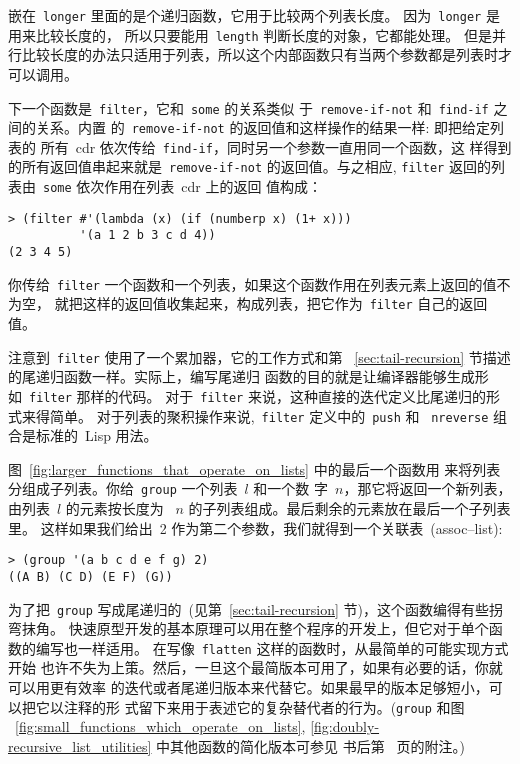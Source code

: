 嵌在~\texttt{longer} 里面的是个递归函数，它用于比较两个列表长度。
因为~\texttt{longer} 是用来比较长度的，
所以只要能用~\texttt{length} 判断长度的对象，它都能处理。
但是并行比较长度的办法只适用于列表，所以这个内部函数只有当两个参数都是列表时才可以调用。

下一个函数是~\texttt{filter}，它和~\texttt{some} 的关系类似
于~\texttt{remove-if-not} 和~\texttt{find-if} 之间的关系。内置
的~\texttt{remove-if-not} 的返回值和这样操作的结果一样: 即把给定列表的
所有~cdr 依次传给~\texttt{find-if}，同时另一个参数一直用同一个函数，这
样得到的所有返回值串起来就是~\texttt{remove-if-not} 的返回值。与之相应,
\texttt{filter} 返回的列表由~\texttt{some} 依次作用在列表~cdr 上的返回
值构成：

\begin{lstlisting}
> (filter #'(lambda (x) (if (numberp x) (1+ x)))
          '(a 1 2 b 3 c d 4))
(2 3 4 5)
\end{lstlisting}

你传给~\texttt{filter} 一个函数和一个列表，如果这个函数作用在列表元素上返回的值不为空，
就把这样的返回值收集起来，构成列表，把它作为~\texttt{filter} 自己的返回值。

注意到~\texttt{filter} 使用了一个累加器，它的工作方式和第
~\ref{sec:tail-recursion} 节描述的尾递归函数一样。实际上，编写尾递归
函数的目的就是让编译器能够生成形如~\texttt{filter} 那样的代码。
对于~\texttt{filter} 来说，这种直接的迭代定义比尾递归的形式来得简单。
对于列表的聚积操作来说,~\texttt{filter} 定义中的~\texttt{push} 和
~\texttt{nreverse} 组合是标准的~Lisp 用法。

图~\ref{fig:larger_functions_that_operate_on_lists} 中的最后一个函数用
来将列表分组成子列表。你给~\texttt{group} 一个列表~$l$ 和一个数
字~$n$，那它将返回一个新列表，由列表~$l$ 的元素按长度为
~$n$ 的子列表组成。最后剩余的元素放在最后一个子列表里。
这样如果我们给出~2 作为第二个参数，我们就得到一个关联表~(assoc--list):
\begin{lstlisting}
> (group '(a b c d e f g) 2)
((A B) (C D) (E F) (G))
\end{lstlisting}

为了把~\texttt{group} 写成尾递归的~(见第~\ref{sec:tail-recursion} 节)，这个函数编得有些拐弯抹角。
快速原型开发的基本原理可以用在整个程序的开发上，但它对于单个函数的编写也一样适用。
在写像~\texttt{flatten} 这样的函数时，从最简单的可能实现方式开始
也许不失为上策。然后，一旦这个最简版本可用了，如果有必要的话，你就可以用更有效率
的迭代或者尾递归版本来代替它。如果最早的版本足够短小，可以把它以注释的形
式留下来用于表述它的复杂替代者的行为。(\texttt{group} 和图
~\ref{fig:small_functions_which_operate_on_lists},
\ref{fig:doubly-recursive_list_utilities} 中其他函数的简化版本可参见
书后第~\pageref{notes:simplified-implementation} 页的附注。)

